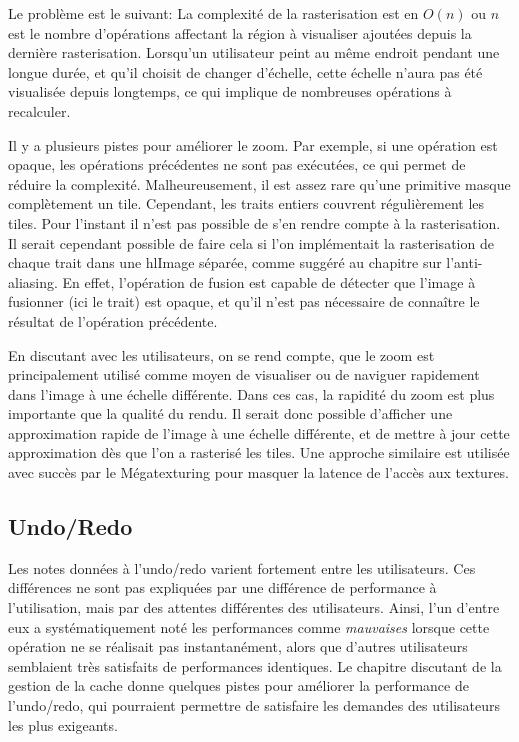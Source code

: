 		Le problème est le suivant: La complexité de la rasterisation est en $O(n)$ ou $n$ est le nombre
		d'opérations affectant la région à visualiser ajoutées depuis la dernière rasterisation. 
		Lorsqu'un utilisateur peint au même endroit pendant une longue
		durée, et qu'il choisit de changer d'échelle, cette échelle n'aura pas été visualisée depuis longtemps, ce qui implique de 
		nombreuses opérations à recalculer. 
		
		Il y a plusieurs pistes pour améliorer le zoom. Par exemple, si une opération est opaque, les opérations précédentes ne sont pas exécutées,
		ce qui permet de réduire la complexité. Malheureusement, il est assez rare qu'une primitive masque complètement un tile. Cependant, les traits
		entiers couvrent régulièrement les tiles. Pour l'instant il n'est pas possible de s'en rendre compte à la rasterisation. Il serait cependant
		possible de faire cela si l'on implémentait la rasterisation de chaque trait dans une hlImage séparée, comme suggéré au chapitre sur l'anti-aliasing.
		En effet, l'opération de fusion est capable de détecter que l'image à fusionner (ici le trait) est opaque, et qu'il n'est pas nécessaire
		de connaître le résultat de l'opération précédente.

		En discutant avec les utilisateurs, on se rend compte, que le zoom est principalement utilisé comme moyen de visualiser ou de naviguer
		rapidement dans l'image à une échelle différente. Dans ces cas, la rapidité du zoom est plus importante que la qualité du rendu.
		Il serait donc possible d'afficher une approximation rapide de l'image à une échelle différente, et de mettre à jour cette approximation dès
		que l'on a rasterisé les tiles. Une approche similaire est utilisée avec succès par le Mégatexturing pour masquer la latence de l'accès aux 
		textures. 
		\subsection{Undo/Redo}
		Les notes données à l'undo/redo varient fortement entre les utilisateurs. Ces différences ne sont pas expliquées par une différence
		de performance à l'utilisation, mais par des attentes différentes des utilisateurs. Ainsi, l'un d'entre eux a systématiquement noté les performances
		comme \emph{mauvaises}  lorsque cette opération ne se réalisait pas instantanément, alors que d'autres utilisateurs semblaient très satisfaits
		de performances identiques. Le chapitre discutant de la gestion de la cache donne quelques pistes pour améliorer la performance 
		de l'undo/redo, qui pourraient permettre de satisfaire les demandes des utilisateurs les plus exigeants. 

